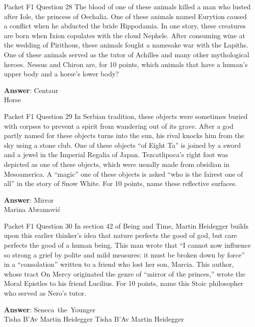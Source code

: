 \begin{frame}{Packet F1 Question 28}
The blood of one of these animals killed a man who lusted after Iole, the princess of Oechalia. One of these animals named Eurytion caused a conflict when he abducted the bride Hippodamia. In one story,   these creatures are born when Ixion copulates   with the cloud Nephele. After consuming wine at the wedding of Pirithous,   these animals fought a namesake war with the Lapiths. One of these animals served as the tutor of Achilles and many other mythological heroes. Nessus and Chiron are, for 10 points, which animals that have a human’s upper body and a horse’s lower body?  

\textbf{Answer}: Centaur\\
 Horse
\end{frame}

\begin{frame}{Packet F1 Question 29}
In Serbian tradition, these objects were sometimes   buried with corpses to prevent a spirit from wandering out of its grave. After a god partly named for these objects   turns into the sun, his rival knocks him from the sky using a stone club. One of these objects “of Eight Ta” is joined by a sword and a jewel in the Imperial Regalia of Japan. Tezcatlipoca’s right foot was depicted as one of these objects, which were usually made from obsidian in Mesoamerica. A   “magic” one of these   objects is asked “who is the fairest one of all” in the story of Snow White. For 10 points, name these reflective surfaces.  

\textbf{Answer}: Mirror\\
 Marina Abramović
\end{frame}

\begin{frame}{Packet F1 Question 30}
In section 42 of Being   and Time, Martin Heidegger   builds upon this earlier thinker’s idea that nature perfects the good of god, but care perfects the good of a human being. This man wrote that “I cannot now influence so strong a grief by polite and mild measures: it must be broken down by force” in a “consolation” written to a friend who lost her son, Marcia. This author, whose tract On Mercy originated the genre of “mirror of the princes,” wrote the Moral Epistles to his friend Lucilius. For 10 points,   name this Stoic philosopher who served   as Nero’s tutor.    

\textbf{Answer}: Seneca\ the\ Younger\\
 Tisha B'Av
 Martin Heidegger
 Tisha B'Av
 Martin Heidegger
\end{frame}

